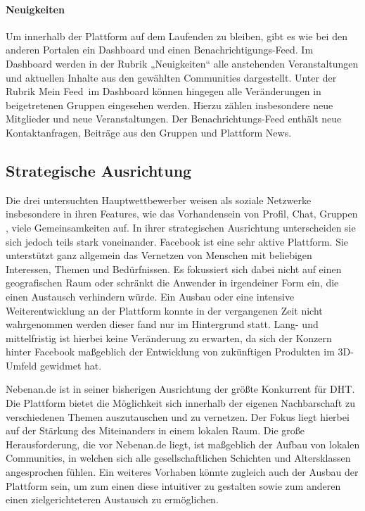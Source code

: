\paragraph{Neuigkeiten}

Um innerhalb der Plattform auf dem Laufenden zu bleiben, gibt es wie bei den anderen Portalen ein Dashboard und einen Benachrichtigungs-Feed.
Im Dashboard werden in der Rubrik „Neuigkeiten“ alle anstehenden Veranstaltungen und aktuellen Inhalte aus den gewählten Communities dargestellt. Unter der Rubrik \glqq Mein Feed\grqq\ im Dashboard können
hingegen alle Veränderungen in beigetretenen Gruppen eingesehen werden. Hierzu zählen insbesondere neue Mitglieder und neue Veranstaltungen.
Der Benachrichtungs-Feed enthält neue Kontaktanfragen, Beiträge aus den Gruppen und Plattform News.

\subsection{Strategische Ausrichtung}

Die drei untersuchten Hauptwettbewerber weisen als soziale Netzwerke insbesondere in ihren Features, wie das Vorhandensein von Profil, Chat, Gruppen \usw, viele Gemeinsamkeiten auf. In ihrer strategischen Ausrichtung unterscheiden sie sich jedoch teils stark voneinander.
Facebook ist eine sehr aktive Plattform. Sie unterstützt ganz allgemein das Vernetzen von Menschen mit beliebigen Interessen, Themen und Bedürfnissen. Es fokussiert sich dabei nicht auf einen geografischen Raum oder schränkt die Anwender in irgendeiner Form ein, die einen Austausch verhindern würde. Ein Ausbau oder eine intensive Weiterentwicklung an der Plattform konnte in der vergangenen Zeit nicht wahrgenommen werden \bzw dieser fand nur im Hintergrund statt. Lang- und mittelfristig ist hierbei keine Veränderung zu erwarten, da sich der Konzern hinter Facebook maßgeblich der Entwicklung von zukünftigen Produkten im 3D-Umfeld gewidmet hat.

Nebenan.de ist in seiner bisherigen Ausrichtung der größte Konkurrent für DHT. Die Plattform bietet die Möglichkeit sich innerhalb der eigenen Nachbarschaft zu verschiedenen Themen auszutauschen und zu vernetzen. Der Fokus liegt hierbei auf der Stärkung des Miteinanders in einem lokalen Raum. Die große Herausforderung, die vor Nebenan.de liegt, ist maßgeblich der Aufbau von lokalen Communities, in welchen sich alle gesellschaftlichen Schichten und Altersklassen angesprochen fühlen. Ein weiteres Vorhaben könnte zugleich auch der Ausbau der Plattform sein, um zum einen diese intuitiver zu gestalten sowie zum anderen einen zielgerichteteren Austausch zu ermöglichen.

